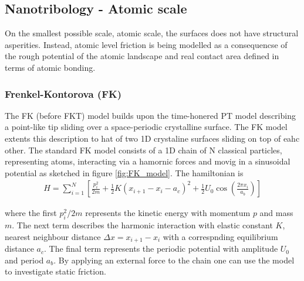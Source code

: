 
\subsection{Nanotribology - Atomic scale}



On the smallest possible scale, atomic scale, the surfaces does not have structural asperities. Instead, atomic level friction is being modelled
as a consequencse of the rough potential of the atomic landscape and real contact area defined in terms of atomic bonding. 

\subsubsection{Frenkel-Kontorova (FK)}



The FK (before FKT) model builds upon the time-honered PT model describing a point-like tip sliding over a space-periodic crystalline surface. The FK model extents this description to hat of two 1D crystaline surfaces sliding on top of eahc other. The standard FK model consists of a 1D chain of N classical particles, representing atoms, interacting via a hamornic forces and movig in a sinusoidal potential as sketched in figure \ref{fig:FK_model}. The hamiltonian is 
\begin{align}
  H = \sum_{i=1}^N \left[\frac{p_i^2}{2m} + \frac{1}{2}K(x_{i+1} - x_i - a_c)^2 + \frac{1}{2}U_0 \cos{\left(\frac{2\pi x_i}{a_b}\right)}\right]
  \label{eq:H_FK}
\end{align}

where the first $p_i^2/2m$ represents the kinetic energy with momentum $p$ and mass $m$. The next term describes the harmonic interaction with elastic constant $K$, nearest neighbour distance $\Delta x = x_{i+1} - x_i$ with a correspnding equilibrium distance $a_c$. The final term represents the periodic potential with amplitude $U_0$ and period $a_b$. By applying an external force to the chain one can use the model to investigate static friction. 

